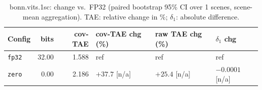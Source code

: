 \begin{table}[t]
\centering
\small
\caption{bonn.vits.1sc: change vs.\ FP32 (paired bootstrap 95\% CI over 1 scenes, scene-mean aggregation). TAE: relative change in \%; $\delta_1$: absolute difference.}
\label{tab:boot_bonn_vits_1sc_sm}
\begin{tabular}{lrrlll}
\toprule
Config & bits & cov-TAE & cov-TAE chg (\%) & raw TAE chg (\%) & $\delta_1$ chg \\
\midrule
\texttt{fp32} & 32.00 & 1.588 & ref & ref & ref \\
\texttt{zero} & 0.00 & 2.186 & $+37.7$ [n/a] & $+25.4$ [n/a] & $-0.0001$ [n/a] \\
\bottomrule
\end{tabular}
\end{table}
